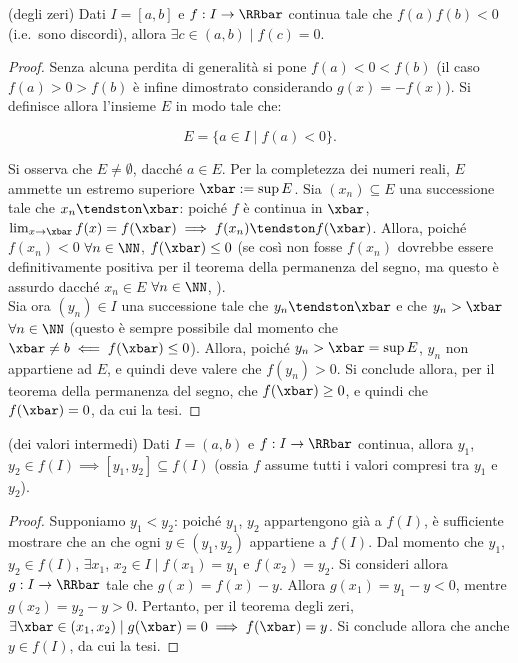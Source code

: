 \documentclass[11pt]{article}
\begin{document}
	\begin{theorem} (degli zeri) Dati $I = [a, b]$ e
		$f : I \to \RRbar$ continua tale che $f(a) f(b) < 0$ (i.e.~sono discordi), allora $\exists c \in (a, b) \mid f(c) = 0$.
	\end{theorem}

	\begin{proof}
		Senza alcuna perdita di generalità si pone $f(a) < 0 < f(b)$ (il caso $f(a) > 0 > f(b)$ è
		infine dimostrato considerando $g(x) = -f(x)$). Si definisce allora l'insieme $E$ in modo tale che:
		
		\[ E = \{ a \in I \mid f(a) < 0 \}. \]
		
		\vskip 0.05in
		
		Si osserva che $E \neq \emptyset$, dacché $a \in E$. Per la completezza dei numeri reali,
		$E$ ammette un estremo superiore $\xbar := \sup E$. Sia $(x_n) \subseteq E$ una successione
		tale che $x_n \tendston \xbar$: poiché $f$ è continua in $\xbar$, $\lim_{x \to \xbar} f(x) = f(\xbar) \implies
		f(x_n) \tendston f(\xbar)$. Allora, poiché $f(x_n) < 0$ $\forall n \in \NN$, $f(\xbar) \leq 0$ (se così non fosse
		$f(x_n)$ dovrebbe essere definitivamente positiva per il teorema della permanenza del segno, ma questo
		è assurdo dacché $x_n \in E$ $\forall n \in \NN$, \Lightning). \\
		
		Sia ora $(y_n) \in I$ una successione tale che $y_n \tendston \xbar$ e che $y_n > \xbar$ $\forall n \in \NN$ (questo
		è sempre possibile dal momento che $\xbar \neq b \impliedby f(\xbar) \leq 0$). Allora,
		poiché $y_n > \xbar = \sup E$, $y_n$ non appartiene ad $E$, e quindi deve valere che $f(y_n) > 0$. Si conclude
		allora, per il teorema della permanenza del segno, che $f(\xbar) \geq 0$, e quindi che $f(\xbar) = 0$, da cui
		la tesi.
	\end{proof}


	\begin{corollary} (dei valori intermedi) Dati $I = (a, b)$ e
		$f : I \to \RRbar$ continua, allora $y_1$, $y_2 \in f(I) \implies
		[y_1, y_2] \subseteq f(I)$ (ossia $f$ assume tutti i valori
		compresi tra $y_1$ e $y_2$).
	\end{corollary}

	\begin{proof}
		Supponiamo $y_1 < y_2$: poiché $y_1$, $y_2$ appartengono già a $f(I)$, è sufficiente mostrare che an che ogni $y \in (y_1, y_2)$ appartiene a $f(I)$. Dal momento che $y_1$, $y_2 \in f(I)$, $\exists x_1$, $x_2 \in I \mid f(x_1) = y_1$ e $f(x_2) = y_2$. Si consideri allora $g : I \to \RRbar$ tale che
		$g(x) = f(x) - y$. Allora $g(x_1) = y_1 - y < 0$, mentre $g(x_2) = y_2 - y > 0$. Pertanto, per il teorema
		degli zeri, $\exists \xbar \in (x_1, x_2) \mid g(\xbar) = 0 \implies f(\xbar) = y$. Si conclude allora che anche
		$y \in f(I)$, da cui la tesi. 
	\end{proof}
\end{document}
